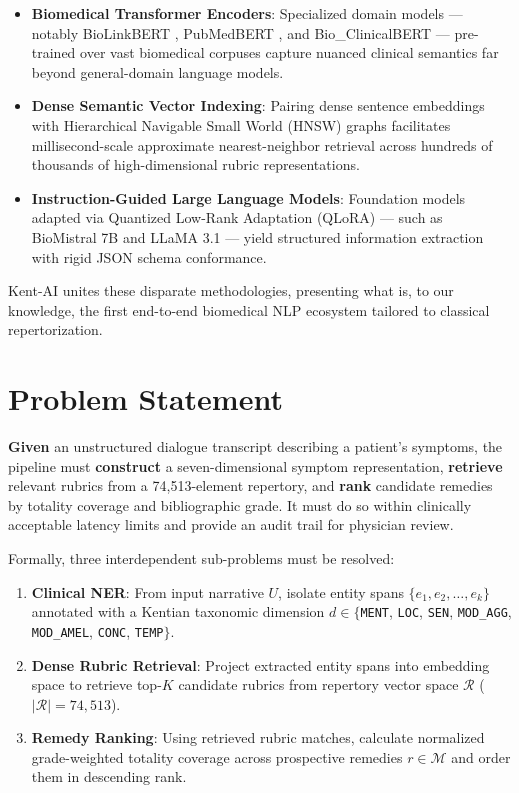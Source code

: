 \begin{itemize}
  \item \textbf{Biomedical Transformer Encoders}: Specialized domain models --- notably BioLinkBERT \cite{yasunaga2022linkbert}, PubMedBERT \cite{gu2021domain}, and Bio\_ClinicalBERT \cite{alsentzer2019publicly} --- pre-trained over vast biomedical corpuses capture nuanced clinical semantics far beyond general-domain language models.
  \item \textbf{Dense Semantic Vector Indexing}: Pairing dense sentence embeddings with Hierarchical Navigable Small World (HNSW) graphs facilitates millisecond-scale approximate nearest-neighbor retrieval across hundreds of thousands of high-dimensional rubric representations.
  \item \textbf{Instruction-Guided Large Language Models}: Foundation models adapted via Quantized Low-Rank Adaptation (QLoRA) --- such as BioMistral 7B and LLaMA 3.1 --- yield structured information extraction with rigid JSON schema conformance.
\end{itemize}

Kent-AI unites these disparate methodologies, presenting what is, to our knowledge, the first end-to-end biomedical NLP ecosystem tailored to classical repertorization.


\section{Problem Statement}

\textbf{Given} an unstructured dialogue transcript describing a patient's symptoms, the pipeline must \textbf{construct} a seven-dimensional symptom representation, \textbf{retrieve} relevant rubrics from a 74,513-element repertory, and \textbf{rank} candidate remedies by totality coverage and bibliographic grade. It must do so within clinically acceptable latency limits and provide an audit trail for physician review.

Formally, three interdependent sub-problems must be resolved:
\begin{enumerate}
  \item \textbf{Clinical NER}: From input narrative $U$, isolate entity spans $\{e_1, e_2, \ldots, e_k\}$ annotated with a Kentian taxonomic dimension $d \in \{$\texttt{MENT}, \texttt{LOC}, \texttt{SEN}, \texttt{MOD\_AGG}, \texttt{MOD\_AMEL}, \texttt{CONC}, \texttt{TEMP}$\}$.
  \item \textbf{Dense Rubric Retrieval}: Project extracted entity spans into embedding space to retrieve top-$K$ candidate rubrics from repertory vector space $\mathcal{R}$ ($|\mathcal{R}| = 74{,}513$).
  \item \textbf{Remedy Ranking}: Using retrieved rubric matches, calculate normalized grade-weighted totality coverage across prospective remedies $r \in \mathcal{M}$ and order them in descending rank.
\end{enumerate}

